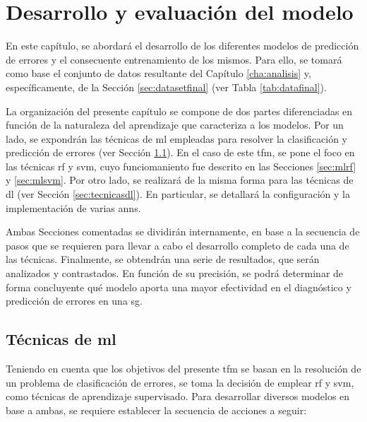 \chapter{Desarrollo y evaluación del modelo}
\label{cha:desarrollo}


En este capítulo, se abordará el desarrollo de los diferentes modelos de predicción de errores y el consecuente entrenamiento de los mismos. Para ello, se tomará como base el conjunto de datos resultante del Capítulo \ref{cha:analisis} y, específicamente, de la Sección \ref{sec:datasetfinal} (ver Tabla \ref{tab:datafinal}).

\vspace{3mm}

La organización del presente capítulo se compone de dos partes diferenciadas en función de la naturaleza del aprendizaje que caracteriza a los modelos. Por un lado, se expondrán las técnicas de \gls{ml} empleadas para resolver la clasificación y predicción de errores (ver Sección \ref{sec:tecnicasml}). En el caso de este \gls{tfm}, se pone el foco en las técnicas \gls{rf} y \gls{svm}, cuyo funciomaniento fue descrito en las Secciones \ref{sec:mlrf} y \ref{sec:mlsvm}. Por otro lado, se realizará de la misma forma para las técnicas de \gls{dl} (ver Sección \ref{sec:tecnicasdl}). En particular, se detallará la configuración y la implementación de varias \gls{ann}s.

\vspace{3mm}

Ambas Secciones comentadas se dividirán internamente, en base a la secuencia de pasos que se requieren para llevar a cabo el desarrollo completo de cada una de las técnicas. Finalmente, se obtendrán una serie de resultados, que serán analizados y contrastados. En función de su precisión, se podrá determinar de forma concluyente qué modelo aporta una mayor efectividad en el diagnóstico y predicción de errores en una \gls{sg}.

\section{Técnicas de \gls{ml}}
\label{sec:tecnicasml}

Teniendo en cuenta que los objetivos del presente \gls{tfm} se basan en la resolución de un problema de clasificación de errores, se toma la decisión de emplear \gls{rf} y \gls{svm}, como técnicas de aprendizaje supervisado. Para desarrollar diversos modelos en base a ambas, se requiere establecer la  secuencia de acciones a seguir: 

